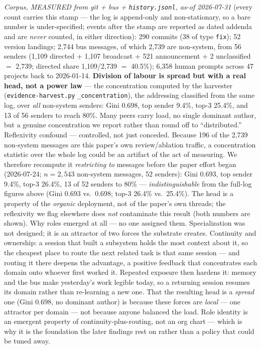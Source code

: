 \documentclass[10pt,conference]{IEEEtran}   %
\begin{document}
\emph{Corpus, MEASURED from git + bus + \texttt{history.jsonl}, as-of 2026-07-31} (every
count carries this stamp --- the log is append-only and non-stationary, so a
bare number is under-specified; events after the stamp are reported as dated addenda and are
\emph{never} counted, in either direction): 290 commits (38 of type \texttt{fix}); 52 version landings;
2,744 bus messages, of which 2,739 are non-system, from 56 senders
(1,109 directed + 1,107 broadcast + 521 announcement + 2 unclassified $=$ 2,739; directed share
1,109/2,739 $=$ 40.5\%);
6,358 human prompts across 47 projects back to 2026-01-14. \textbf{Division of labour is
spread but with a real head, not a power law} --- the concentration computed by the harvester
(\texttt{evidence-harvest.py} \texttt{\_concentration}), the addressing classified from the same log,
over \emph{all} non-system senders:
Gini 0.698, top sender 9.4\%, top-3 25.4\%, and 13 of 56 senders to reach 80\%.
Many peers carry load, no single dominant author, but a genuine concentration we report rather than
round off to ``distributed.'' Reflexivity confound --- controlled, not just conceded.
Because 196 of the 2,739 non-system messages are this paper's own review/ablation traffic, a
concentration statistic over the whole log could be an artifact of the act of measuring. We therefore
recompute it \emph{restricting to} messages before the paper effort began
(2026-07-24; $n{=}2{,}543$ non-system messages, 52 senders): Gini $0.693$, top sender 9.4\%,
top-3 26.4\%, 13 of 52 senders to 80\% --- \emph{indistinguishable} from the full-log figures above
(Gini $0.693$ vs.\ $0.698$; top-3 26.4\% vs.\ 25.4\%). The head is a property of the \emph{organic}
deployment, not of the paper's own threads; the reflexivity we flag elsewhere does \emph{not}
contaminate this result (both numbers are shown).
Why roles emerged at all --- no one assigned them. Specialization was not designed; it is an
attractor of two forces the substrate creates. Continuity and ownership: a session that built
a subsystem holds the most context about it, so the cheapest place to route the next related task is
that same session --- and routing it there deepens the advantage, a positive feedback that concentrates
each domain onto whoever first worked it. Repeated exposure then hardens it: memory and the bus
make yesterday's work legible today, so a returning session resumes its domain rather than re-learning a
new one. That the resulting head is a \emph{spread} one (Gini 0.698, no dominant author) is because these
forces are \emph{local} --- one attractor per domain --- not because anyone balanced the load. Role
identity is an emergent property of continuity-plus-routing, not an org chart --- which is why it is the
foundation the later findings rest on rather than a policy that could be tuned away.
\end{document}
